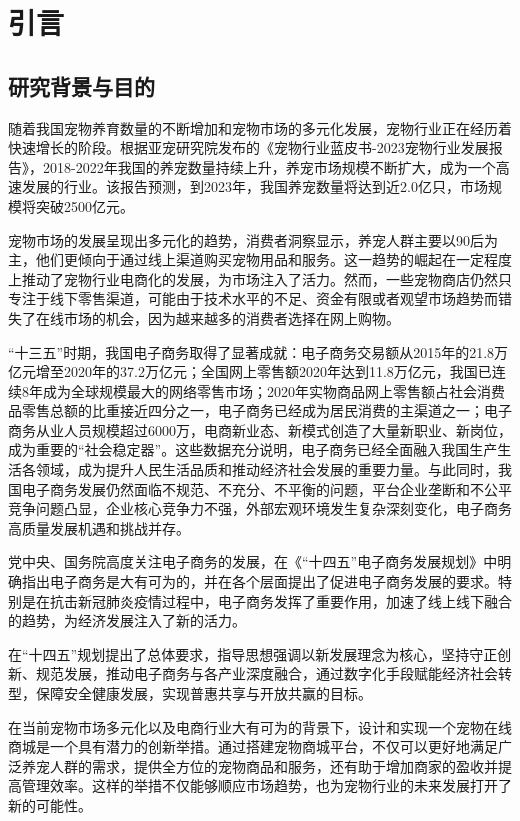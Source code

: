 
\chapter{引言}
\section{研究背景与目的}

随着我国宠物养育数量的不断增加和宠物市场的多元化发展，宠物行业正在经历着快速增长的阶段。根据亚宠研究院发布的《宠物行业蓝皮书-2023宠物行业发展报告》，2018-2022年我国的养宠数量持续上升，养宠市场规模不断扩大，成为一个高速发展的行业。该报告预测，到2023年，我国养宠数量将达到近2.0亿只，市场规模将突破2500亿元。\par  %
宠物市场的发展呈现出多元化的趋势，消费者洞察显示，养宠人群主要以90后为主，他们更倾向于通过线上渠道购买宠物用品和服务。这一趋势的崛起在一定程度上推动了宠物行业电商化的发展，为市场注入了活力。然而，一些宠物商店仍然只专注于线下零售渠道，可能由于技术水平的不足、资金有限或者观望市场趋势而错失了在线市场的机会，因为越来越多的消费者选择在网上购物。\par  %
“十三五”时期，我国电子商务取得了显著成就：电子商务交易额从2015年的21.8万亿元增至2020年的37.2万亿元；全国网上零售额2020年达到11.8万亿元，我国已连续8年成为全球规模最大的网络零售市场；2020年实物商品网上零售额占社会消费品零售总额的比重接近四分之一，电子商务已经成为居民消费的主渠道之一；电子商务从业人员规模超过6000万，电商新业态、新模式创造了大量新职业、新岗位，成为重要的“社会稳定器”。这些数据充分说明，电子商务已经全面融入我国生产生活各领域，成为提升人民生活品质和推动经济社会发展的重要力量。与此同时，我国电子商务发展仍然面临不规范、不充分、不平衡的问题，平台企业垄断和不公平竞争问题凸显，企业核心竞争力不强，外部宏观环境发生复杂深刻变化，电子商务高质量发展机遇和挑战并存。\par  %
党中央、国务院高度关注电子商务的发展，在《“十四五”电子商务发展规划》中明确指出电子商务是大有可为的，并在各个层面提出了促进电子商务发展的要求。特别是在抗击新冠肺炎疫情过程中，电子商务发挥了重要作用，加速了线上线下融合的趋势，为经济发展注入了新的活力。\par  %
在“十四五”规划提出了总体要求，指导思想强调以新发展理念为核心，坚持守正创新、规范发展，推动电子商务与各产业深度融合，通过数字化手段赋能经济社会转型，保障安全健康发展，实现普惠共享与开放共赢的目标。\par  %
在当前宠物市场多元化以及电商行业大有可为的背景下，设计和实现一个宠物在线商城是一个具有潜力的创新举措。通过搭建宠物商城平台，不仅可以更好地满足广泛养宠人群的需求，提供全方位的宠物商品和服务，还有助于增加商家的盈收并提高管理效率。这样的举措不仅能够顺应市场趋势，也为宠物行业的未来发展打开了新的可能性。\par  %
